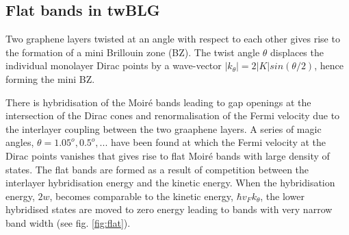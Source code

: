 \subsection{Flat bands in twBLG}
Two graphene layers twisted at an angle with respect to each other gives rise to the formation of a mini Brillouin zone (BZ). The twist angle $\theta$ displaces the individual monolayer Dirac points by a wave-vector $|k_\theta|=2|K|sin(\theta/2)$, hence forming the mini BZ.

There is hybridisation of the Moiré bands leading to gap openings at the intersection of the Dirac cones and renormalisation of the Fermi velocity due to the interlayer coupling between the two graaphene layers. A series of magic angles, $\theta=1.05^o, 0.5^o, ...$ have been found at which the Fermi velocity at the Dirac points vanishes that gives rise to flat Moiré bands with large density of states. \cite{Bistritzer12233} The flat bands are formed as a result of competition between the interlayer hybridisation energy and the kinetic energy. When the hybridisation energy, $2w$, becomes comparable to the kinetic energy, $\hbar v_Fk_\theta$, the lower hybridised states are moved to zero energy leading to bands with very narrow band width (see fig. \ref{fig:flat}). \cite{Cao2018}
